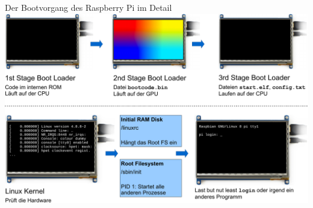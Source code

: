 







\begin{frame}{Der Bootvorgang des Raspberry Pi im Detail}
    \includegraphics[width=\textwidth]{8-linux/img/pi-bootvorgang}
\end{frame}


